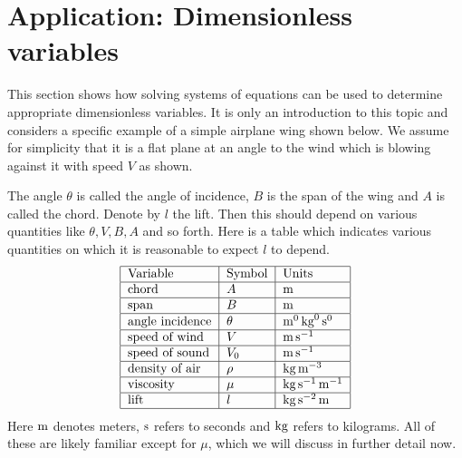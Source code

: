 \section{Application: Dimensionless variables}

This section shows how solving systems of equations can be used to
determine appropriate dimensionless variables. It is only an
introduction to this topic and considers a specific example of a
simple airplane wing shown below. We assume for simplicity that it is
a flat plane at an angle to the wind which is blowing against it with
speed $V$ as shown.

\begin{center}
\end{center}

The angle $\theta$ is called the angle of incidence, $B$ is the span
of the wing and $A$ is called the chord. Denote by $l$ the lift. Then
this should depend on various quantities like $\theta,V,B,A$ and so
forth. Here is a table which indicates various quantities on which it
is reasonable to expect $l$ to depend.
\begin{equation*}
  \begin{tabular}{|l|l|l|}
    \hline
    Variable & Symbol & Units \\ \hline
    chord & $A$ & $\m$ \\ \hline
    span & $B$ & $\m$ \\ \hline
    angle incidence & $\theta $ & $\m^0\kg^0\s^0$ \\ \hline
    speed of wind & $V$ & $\m\s^{-1}$ \\ \hline
    speed of sound & $V_0$ & $\m\s^{-1}$ \\ \hline
    density of air & $\rho $ & $\kg\m^{-3}$ \\ \hline
    viscosity & $\mu $ & $\kg\s^{-1}\m^{-1}$ \\ \hline
    lift & $l$ & $\kg\s^{-2}\m$ \\ \hline
  \end{tabular}
\end{equation*}
Here $\mathop{\textrm{\rm m}}\nolimits$ denotes meters, $\mathop{\textrm{\rm s}}\nolimits $ refers to seconds and $\mathop{\textrm{\rm kg}}\nolimits$ refers to
kilograms. All of these are likely familiar except for $\mu$, which we
will discuss in further detail now.

